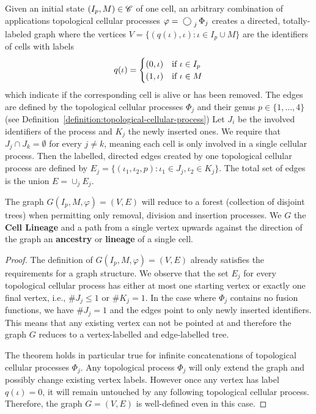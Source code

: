 \begin{theorem}
    Given an initial state $(I_p,M)\in\mathscr{C}$ of one cell, an arbitrary combination of
    applications topological cellular processes $\varphi = \bigcomp_j\Phi_j$ creates a
    directed, totally-labeled graph where the vertices
    $V=\{(q(\iota),\iota):\iota\in I_p\cup M\}$ are the identifiers of cells with labels
    \begin{equation}
        q(\iota) = \begin{cases}
            (0,\iota) & \text{\normalfont if } \iota\in I_p\\
            (1,\iota) & \text{\normalfont if } \iota\in M
        \end{cases}
    \end{equation}
    which indicate if the corresponding cell is alive or has been removed.
    The edges are defined by the topological cellular processes $\Phi_j$ and their genus
    $p\in\{1,\dots,4\}$ (see Definition~\ref{definition:topological-cellular-process})
    Let $J_i$ be the involved identifiers of the process and $K_j$ the newly inserted ones.
    We require that $J_j\cap J_k=\emptyset$ for every $j\neq k$, meaning each cell is only involved
    in a single cellular process.
    Then the labelled, directed edges created by one topological cellular process are defined by
    $E_j=\{(\iota_1,\iota_2,p):\iota_1\in J_j,\iota_2\in K_j\}$.
    The total set of edges is the union $E=\cup_j E_j$.

    The graph $G(I_p,M,\varphi)=(V,E)$ will reduce to a forest (collection of disjoint trees) when
    permitting only removal, division and insertion processes.
    We $G$ the \textbf{Cell Lineage} and a path from a single vertex upwards against the direction
    of the graph an \textbf{ancestry} or \textbf{lineage} of a single cell.
    \label{theorem:cell-lineage}
\end{theorem}

\begin{proof}
    The definition of $G(I_p,M,\varphi)=(V,E)$ already satisfies the requirements for a graph
    structure.
    We observe that the set $E_j$ for every topological cellular process has either at most one
    starting vertex or exactly one final vertex, i.e., $\#J_j\leq1$ or $\#K_j=1$.
    In the case where $\Phi_j$ contains no fusion functions, we have $\#J_j=1$ and the edges point
    to only newly inserted identifiers.
    This means that any existing vertex can not be pointed at and therefore the graph $G$ reduces to
    a vertex-labelled and edge-labelled tree.

    The theorem holds in particular true for infinite concatenations of topological cellular
    processes $\Phi_j$.
    Any topological process $\Phi_j$ will only extend the graph and possibly change existing vertex
    labels.
    However once any vertex has label $q(\iota)=0$, it will remain untouched by any following
    topological cellular process.
    Therefore, the graph $G=(V,E)$ is well-defined even in this case.
\end{proof}

